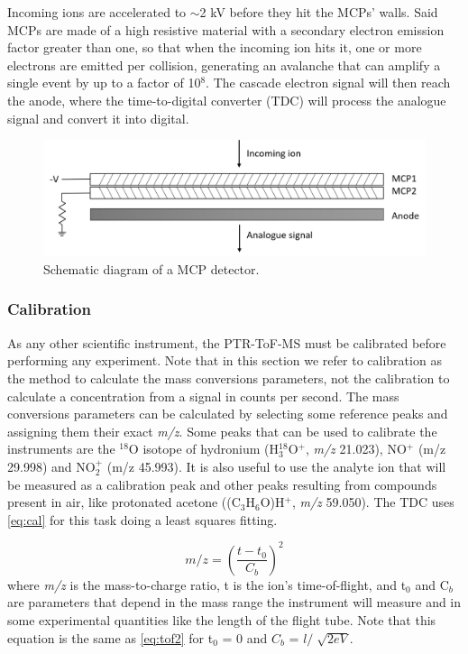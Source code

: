 Incoming ions are accelerated to $\sim$2 kV before they hit the MCPs' walls. Said MCPs are made of a high resistive material with a secondary electron emission factor greater than one, so that when the incoming ion hits it,  one or more electrons are emitted per collision, generating an avalanche that can amplify a single event by up to a factor of 10$^8$. The cascade electron signal will then reach the anode, where the time-to-digital converter (TDC) will process the analogue signal and convert it into digital.


\begin{figure}%
\centering
\includegraphics[width=0.6\linewidth]{pics/mcp.png}
\centering
\caption{Schematic diagram of a MCP detector.}
\label{fig:det}
\end{figure}


\subsubsection{Calibration}
As any other scientific instrument, the PTR-ToF-MS must be calibrated before performing any experiment. Note that in this section we refer to calibration as the method to calculate the mass conversions parameters, not the calibration to calculate a concentration from a signal in counts per second. The mass conversions parameters can be calculated by selecting some reference peaks and assigning them their exact \textit{m/z}.
Some peaks that can be used to calibrate the instruments are the $^{18}$O isotope of hydronium (H$_3^{18}$O$^+$, \textit{m/z} 21.023), NO$^{+}$ (m/z 29.998) and  NO$_2^{+}$ (m/z 45.993). It is also useful to use the analyte ion that will be measured as a calibration peak and other peaks resulting from compounds present in air, like protonated acetone ((C$_3$H$_6$O)H$^+$, \textit{m/z} 59.050).  The TDC uses \autoref{eq:cal} for this task doing a least squares fitting.

\begin{equation}
\label{eq:cal}
m\slash z =  \left(\frac{t-t_0}{C_b}\right)^2
\end{equation}
where \textit{m/z} is the mass-to-charge ratio, t is the ion's time-of-flight, and t$_0$ and C$_b$ are parameters that depend in the mass range the instrument will measure and in some experimental quantities like the length of the flight tube. Note that this equation is the same as \autoref{eq:tof2} for t$_0$ = 0 and $C_b$ = $l/\sqrt[]{2eV}$.



